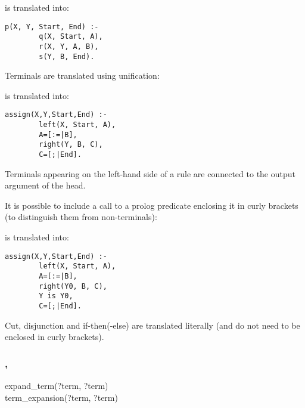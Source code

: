 is translated into:

\begin{Indentation}
\begin{verbatim}
p(X, Y, Start, End) :-
        q(X, Start, A),
        r(X, Y, A, B),
        s(Y, B, End).
\end{verbatim}
\end{Indentation}

Terminals are translated using unification:


is translated into:

\begin{Indentation}
\begin{verbatim}
assign(X,Y,Start,End) :-
        left(X, Start, A),
        A=[:=|B],
        right(Y, B, C),
        C=[;|End].
\end{verbatim}
\end{Indentation}

Terminals appearing on the left-hand side of a rule are connected to the
output argument of the head.

It is possible to include a call to a prolog predicate enclosing it in curly
brackets (to distinguish them from non-terminals):


is translated into:

\begin{Indentation}
\begin{verbatim}
assign(X,Y,Start,End) :-
        left(X, Start, A),
        A=[:=|B],
        right(Y0, B, C),
        Y is Y0,
        C=[;|End].
\end{verbatim}
\end{Indentation}

Cut, disjunction and if-then(-else) are translated literally (and do not need
to be enclosed in curly brackets).

\subsubsection{,\label{expand-term/2}
               }


\begin{TemplatesOneCol}
expand\_term(?term, ?term)\\
term\_expansion(?term, ?term)

\end{TemplatesOneCol}


